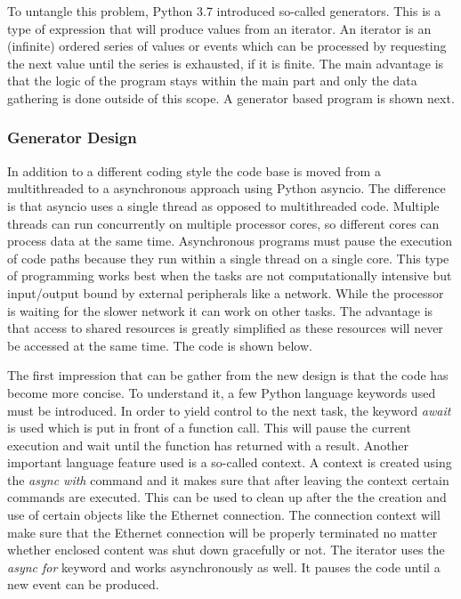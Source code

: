 To untangle this problem, Python 3.7 introduced so-called generators. This is a type of expression that will produce values from an iterator. An iterator is an (infinite) ordered series of values or events which can be processed by requesting the next value until the series is exhausted, if it is finite. The main advantage is that the logic of the program stays within the main part and only the data gathering is done outside of this scope. A generator based program is shown next.

\subsubsection{Generator Design}
In addition to a different coding style the code base is moved from a multithreaded to a asynchronous approach using Python asyncio. The difference is that asyncio uses a single thread as opposed to multithreaded code. Multiple threads can run concurrently on multiple processor cores, so different cores can process data at the same time. Asynchronous programs must pause the execution of code paths because they run within a single thread on a single core. This type of programming works best when the tasks are not computationally intensive but input/output bound by external peripherals like a network. While the processor is waiting for the slower network it can work on other tasks. The advantage is that access to shared resources is greatly simplified as these resources will never be accessed at the same time. The code is shown below.


The first impression that can be gather from the new design is that the code has become more concise. To understand it, a few Python language keywords used must be introduced. In order to yield control to the next task, the keyword \textit{await} is used which is put in front of a function call. This will pause the current execution and wait until the function has returned with a result. Another important language feature used is a so-called context. A context is created using the \textit{async with} command and it makes sure that after leaving the context certain commands are executed. This can be used to clean up after the the creation and use of certain objects like the Ethernet connection. The connection context will make sure that the Ethernet connection will be properly terminated no matter whether enclosed content was shut down gracefully or not. The iterator uses the \textit{async for} keyword and works asynchronously as well. It pauses the code until a new event can be produced.

